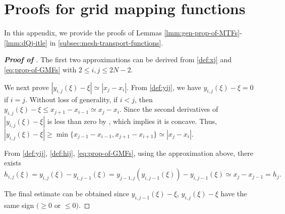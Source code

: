 \documentclass{amsart}
\theoremstyle{definition}
\theoremstyle{remark}
\numberwithin{equation}{section}
\begin{document}
\section{Proofs for grid mapping functions}
\label{sec:prfs-of-GMFs}
In this appendix, we provide the proofs of Lemmas \ref{lmm:gen-prop-of-MTFs}-\ref{lmm:dQj-itle} in \cref{subsec:mesh-transport-functions}.
\begin{proof} [\bf Proof of ]
  \label{prf:gen-prop-of-MTFs}
  The first two approximations can be derived from \eqref{def:xj} and \eqref{eq:prop-of-GMFs} with $2\le i, j \le 2N-2$.    \par
  We next prove $|y_{i,j}(\xi) - \xi| \simeq |x_j - x_i|$.
  From \eqref{def:yij}, we have $y_{i,j}(\xi)-\xi = 0$ if $i=j$. 
  Without loss of generality, if $i< j$, then $ y_{i,j}(\xi) - \xi \le x_{j+1} - x_{i-1} \simeq x_j - x_i$.
  Since the second derivatives of $|y_{i,j}(\xi) - \xi|$ is less than zero by , which implies it is concave. Thus, $|y_{i,j}(\xi) - \xi| \ge \min\{x_{j-1}-x_{i-1}, x_{j+1}-x_{i+1}\} \simeq |x_{j} - x_{i}| $.  \par
  From \eqref{def:yij}, \eqref{def:hij}, \eqref{eq:prop-of-GMFs}, using the approximation above, there exists
  $$ h_{i,j}(\xi) = y_{i,j}(\xi) - y_{i,j-1}(\xi) = y_{j-1, j}(y_{i,j-1}(\xi)) - y_{i,j-1}(\xi) \simeq x_{j} - x_{j-1}=h_j. $$
  
  The final estimate can be obtained since \(y_{i,j-1}(\xi) - \xi\), \(y_{i,j}(\xi) - \xi\) have the same sign \((\ge 0\) or \(\le 0)\).
\end{proof}
\end{document}
